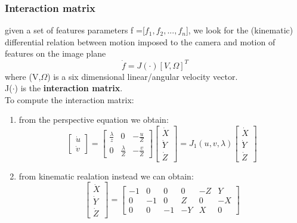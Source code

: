 \documentclass[a4paper,12pt]{article}
\begin{document}
\subsubsection{Interaction matrix}
given a set of features parameters f =[$f_1,f_2,...,f_n$], we look 
for the (kinematic) differential relation between
motion imposed to the camera and motion of features on the
image plane \begin{equation}
\dot{f}=J(\cdot)[V, \Omega]^T
\end{equation}
where (V,$\Omega$) is a six dimensional linear/angular velocity vector.\\
J($\cdot$) is the \textbf{interaction matrix}.\\
To compute the interaction matrix: \begin{enumerate}
    \item from the perspective equation we obtain:\begin{equation}
    \begin{bmatrix}
    \dot{u}\\
    \dot{v}
    \end{bmatrix}=
    \begin{bmatrix}
    \frac{\lambda}{z} & 0 & -\frac{u}{Z}\\
    0 & \frac{\lambda}{Z} & -\frac{v}{Z}
    \end{bmatrix}
    \begin{bmatrix}
        \dot{X}\\
        \dot{Y}\\
        \dot{Z}
    \end{bmatrix}
    =J_1(u,v,\lambda)\begin{bmatrix}
    \dot{X}\\
    \dot{Y}\\
    \dot{Z}
    \end{bmatrix}
    \end{equation}
    \item from kinematic realation instead we can obtain:\begin{equation}
    \begin{bmatrix}
    \dot{X}\\
    \dot{Y}\\
    \dot{Z}
    \end{bmatrix}=
    \begin{bmatrix}
        -1 & 0 & 0 & 0 & -Z & Y \\
        0 & -1 & 0 & Z & 0 & -X \\
        0 & 0 & -1 & -Y & X & 0
    \end{bmatrix}

\end{equation}
\end{enumerate}
\end{document}
